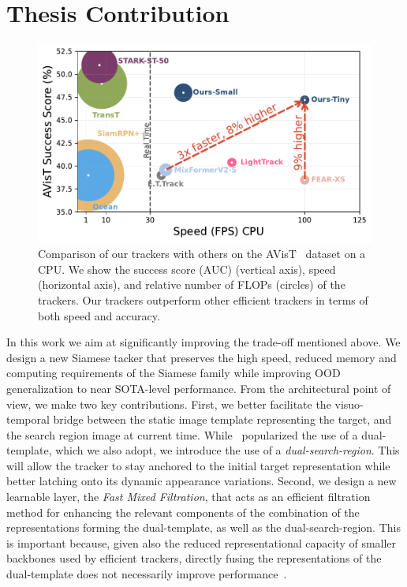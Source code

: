 \section{Thesis Contribution}

\begin{figure}
    \centering
        \includegraphics[width=1.0\textwidth]{figures/avist_comparison_fig_new.pdf}
    \caption{Comparison of our trackers with others on the AVisT~\cite{noman2022avist} dataset on a CPU. We show the success score (AUC) (vertical axis), speed (horizontal axis), and relative number of FLOPs (circles) of the trackers. Our trackers outperform other efficient trackers in terms of both speed and accuracy.}
    \label{fig:avist_comparision_fig}
\end{figure}

In this work we aim at significantly improving the trade-off mentioned above. We design a new Siamese tacker that preserves the high speed, reduced memory and computing requirements of the Siamese family while improving OOD generalization to near SOTA-level performance. From the architectural point of view, we make two key contributions. First, we better facilitate the visuo-temporal bridge between the static image template representing the target, and the search region image at current time. While~\cite{borsuk2022fear} popularized the use of a dual-template, which we also adopt, we introduce the use of a \emph{dual-search-region}. This will allow the tracker to stay anchored to the initial target representation while better latching onto its dynamic appearance variations. Second, we design a new learnable layer, the \emph{Fast Mixed Filtration}, that acts as an efficient filtration method for enhancing the relevant components of the combination of the representations forming the dual-template, as well as the dual-search-region. This is important because, given also the reduced representational capacity of smaller backbones used by efficient trackers, directly fusing the representations of the dual-template does not necessarily improve performance~\cite{borsuk2022fear}.


